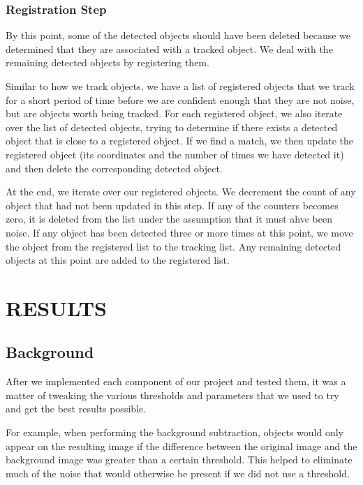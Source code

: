 \documentclass[a4paper, 10pt, conference]{ieeeconf}      %
\begin{document}
\subsubsection{Registration Step}

By this point, some of the detected objects should have been deleted because we determined that they are associated with a tracked object. We deal with the remaining detected objects by registering them. \newline

Similar to how we track objects, we have a list of registered objects that we track for a short period of time before we are confident enough that they are not noise, but are objects worth being tracked. For each registered object, we also iterate over the list of detected objects, trying to determine if there exists a detected object that is close to a registered object. If we find a match, we then update the registered object (its coordinates and the number of times we have detected it) and then delete the corresponding detected object. \newline

At the end, we iterate over our registered objects. We decrement the count of any object that had not been updated in this step. If any of the counters becomes zero, it is deleted from the list under the assumption that it must ahve been noise. If any object has been detected three or more times at this point, we move the object from the registered list to the tracking list. Any remaining detected objects at this point are added to the registered list. \newline

\section{RESULTS}

\subsection{Background}
After we implemented each component of our project and tested them, it was a matter of tweaking the various thresholds and parameters that we used to try and get the best results possible. \newline

For example, when performing the background subtraction, objects would only appear on the resulting image if the difference between the original image and the background image was greater than a certain threshold. This helped to eliminate much of the noise that would otherwise be present if we did not use a threshold. \newline
\end{document}
